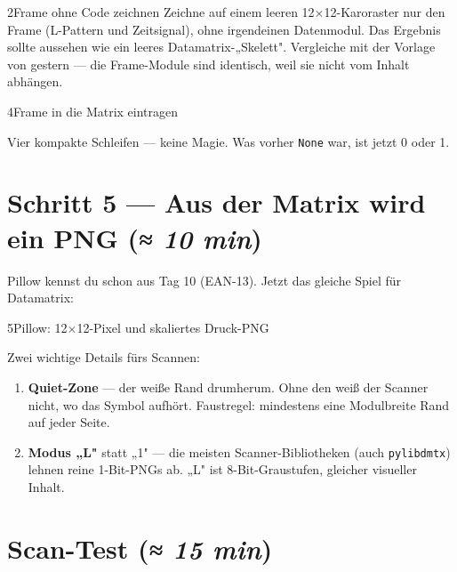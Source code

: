 \begin{bleistiftuebung}{2}{Frame ohne Code zeichnen}
Zeichne auf einem leeren 12$\times$12-Karoraster nur den Frame
(L-Pattern und Zeitsignal), ohne irgendeinen Datenmodul. Das
Ergebnis sollte aussehen wie ein leeres Datamatrix-„Skelett".
Vergleiche mit der Vorlage von gestern — die Frame-Module sind
identisch, weil sie nicht vom Inhalt abhängen.
\end{bleistiftuebung}

\begin{pythoneinheit}{4}{Frame in die Matrix eintragen}

Vier kompakte Schleifen — keine Magie. Was vorher \texttt{None} war,
ist jetzt 0 oder 1.
\end{pythoneinheit}

\section{Schritt 5 — Aus der Matrix wird ein PNG \normalfont(\textit{≈ 10 min})}

Pillow kennst du schon aus Tag 10 (EAN-13). Jetzt das gleiche Spiel
für Datamatrix:

\begin{pythoneinheit}{5}{Pillow: 12$\times$12-Pixel und skaliertes Druck-PNG}

Zwei wichtige Details fürs Scannen:

\begin{enumerate}
\item \textbf{Quiet-Zone} — der weiße Rand drum­herum. Ohne den
  weiß der Scanner nicht, wo das Symbol aufhört. Faustregel:
  mindestens eine Modulbreite Rand auf jeder Seite.
\item \textbf{Modus „L"} statt „1" — die meisten Scanner-Bibliotheken
  (auch \texttt{pylibdmtx}) lehnen reine 1-Bit-PNGs ab. „L" ist
  8-Bit-Graustufen, gleicher visueller Inhalt.
\end{enumerate}
\end{pythoneinheit}

\section{Scan-Test \normalfont(\textit{≈ 15 min})}


